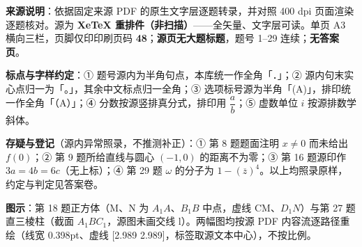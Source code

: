 


\begin{gktip}
\textbf{来源说明}：依据固定来源 PDF 的原生文字层逐题转录，并对照 400 dpi 页面渲染逐题核对。源为 \textbf{XeTeX 重排件（非扫描）}——全矢量、文字层可读。单页 A3 横向三栏，页脚仅印印刷页码 \textbf{48}；\textbf{源页无大题标题}，题号 1–29 连续；\textbf{无答案页}。

\textbf{标点与字样约定}：① 题号源内为半角句点，本库统一作全角「．」；② 源内句末实心点归一为「。」，其余中文标点归一全角；③ 选项标号源为半角「(A)」，排印统一作全角「（A）」；④ 分数按源竖排真分式，排印用 \(\dfrac{a}{b}\)；⑤ 虚数单位 \(i\) 按源排数学斜体。

\textbf{存疑与登记}（源内异常照录，不推测补正）：① 第 8 题题面注明 \(x\ne0\) 而未给出 \(f(0)\)；② 第 9 题所给直线与圆心 \((-1,0)\) 的距离不为零；③ 第 16 题源印作 \(3a=4b=6c\)（无上标）；④ 第 29 题 \(\omega\) 的分子为 \(1-(\overline z)^4\)。以上均照录原样，约定与判定见答案卷。

\textbf{图示}：第 18 题正方体（M、N 为 \(A_1A\)、\(B_1B\) 中点，虚线 CM、\(D_1N\)）与第 27 题直三棱柱（截面 \(A_1BC_1\)，源图未画交线 l）。两幅图均按源 PDF 内容流逐路径重绘（线宽 0.398pt、虚线 [2.989 2.989]，标签取源文本中心），不按比例。
\end{gktip}

